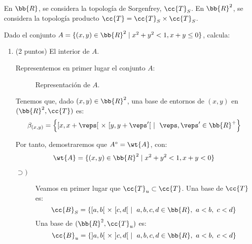\documentclass[12pt]{article}
\newcommand{\T}[0]{\cc{T}}
\begin{document}
    En $\bb{R}$, se considera la topología de Sorgenfrey, $\T_S$. En $\bb{R}^2$, se considera la topología producto $\T=\T_S\times \T_S$.
    \begin{ejercicio}
        Dado el conjunto $A=\{(x,y)\in \bb{R}^2\mid x^2+y^2<1, x+y\leq 0\}$, calcula:
        \begin{enumerate}
            \item (2 puntos) El interior de $A$.
            
            Representemos en primer lugar el conjunto $A$:
            \begin{figure}[H]
                \centering
                \caption{Representación de $A$.}
            \end{figure}

            Tenemos que, dado $(x,y)\in \bb{R}^2$, una base de entornos de $(x,y)$ en $(\bb{R}^2,\T)$ es:
            \begin{equation*}
                \beta_{(x,y)} = \left\{[x,x+\veps[~\times~[y,y+\veps'[~\mid~\veps,\veps'\in \bb{R}^+\right\}
            \end{equation*}

            Por tanto, demostraremos que $A^\circ = \wt{A}$, con:
            \begin{equation*}
                \wt{A}=\{(x,y)\in \bb{R}^2\mid x^2+y^2<1, x+y< 0\}
            \end{equation*}
            \begin{description}
                \item[$\supset)$] Veamos en primer lugar que $\T_u \subset \T$. Una base de $\T$ es:
                \begin{equation*}
                    \cc{B}_S = \left\{[a,b[~\times ~[c,d[~\mid~a,b,c,d\in \bb{R},~ a<b,~c<d\right\}
                \end{equation*}
                Una base de $(\bb{R}^2, \T_u)$ es:
                \begin{equation*}
                    \cc{B}_u = \left\{]a,b[~\times ~]c,d[~\mid~a,b,c,d\in \bb{R},~ a<b,~c<d\right\}
                \end{equation*}


\end{description}
\end{enumerate}
\end{ejercicio}
\end{document}
